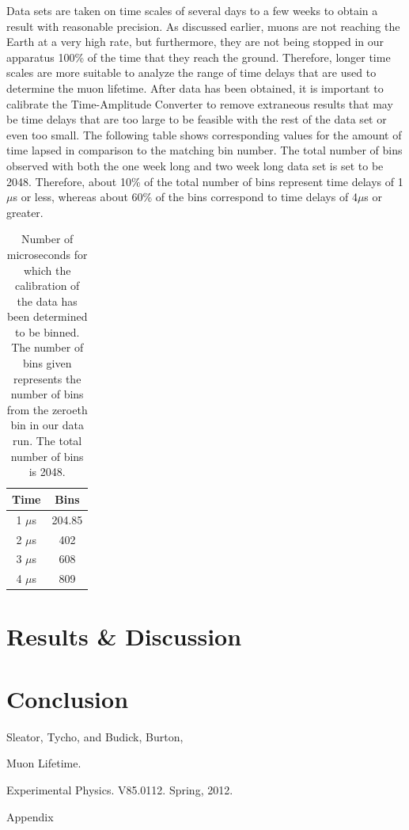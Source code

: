 Data sets are taken on time scales of several days to a few weeks to obtain a result with reasonable precision. As discussed earlier, muons are not reaching the Earth at a very high rate, but furthermore, they are not being stopped in our apparatus 100\% of the time that they reach the ground. Therefore, longer time scales are more suitable to analyze the range of time delays that are used to determine the muon lifetime. After data has been obtained, it is important to calibrate the Time-Amplitude Converter to remove extraneous results that may be time delays that are too large to be feasible with the rest of the data set or even too small. The following table shows corresponding values for the amount of time lapsed in comparison to the matching bin number. The total number of bins observed with both the one week long and two week long data set is set to be 2048. Therefore, about 10\% of the total number of bins represent time delays of 1$\mu$s or less, whereas about 60\% of the bins correspond to time delays of 4$\mu$s or greater. 
\begin{table}[h]
\begin{center}
\begin{tabular}{|c|c|}\hline
Time & Bins\\ \hline
1 $\mu$s & 204.85\\ \hline
2 $\mu$s & 402 \\ \hline
3 $\mu$s & 608 \\ \hline
4 $\mu$s & 809 \\ \hline
\end{tabular}
\caption{Number of microseconds for which the calibration of the data has been determined to be binned. The number of bins given represents the number of bins from the zeroeth bin in our data run. The total number of bins  is 2048.}
\end{center}
\end{table}



\section{Results \& Discussion}

\section{Conclusion}

\begin{thebibliography}{99}
Sleator, Tycho, and Budick, Burton, \begin{em}Muon Lifetime. \end{em}Experimental Physics. V85.0112. Spring, 2012.
\end{thebibliography}

\newpage \LARGE{Appendix}

  
